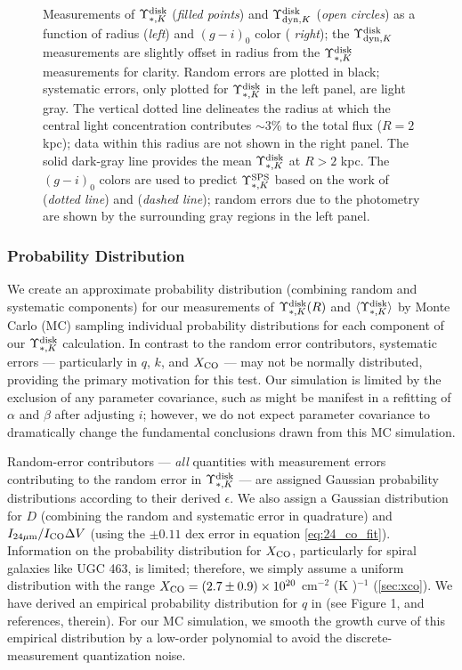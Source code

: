 \documentclass[apj,iop,numberedappendix]{emulateapj}
\begin{document}
\begin{figure}
\caption{
%
Measurements of $\Upsilon_{\ast,K}^{\rm disk}$ ({\it filled points}) and $\Upsilon_{{\rm dyn},K}^{\rm disk}$ ({\it open
circles}) as a function of radius ({\it left}) and $(g-i)_0$ color ({\it
right}); the $\Upsilon_{{\rm dyn},K}^{\rm disk}$ measurements are slightly offset in radius from the
$\Upsilon_{\ast,K}^{\rm disk}$ measurements for clarity.  Random errors are plotted in black;
systematic errors, only plotted for $\Upsilon_{\ast,K}^{\rm disk}$ in the left panel, are light
gray.  The vertical dotted line delineates the radius at which the central light
concentration contributes $\sim3$\% to the total flux ($R=2$ kpc); data within
this radius are not shown in the right panel.  The solid dark-gray line provides
the mean $\Upsilon_{\ast,K}^{\rm disk}$ at $R>2$ kpc.  The $(g-i)_0$ colors are used to predict
$\Upsilon_{\ast,K}^{\rm SPS}$ based on the work of  ({\it dotted
line}) and  ({\it dashed line}); random errors
due to the photometry are shown by the surrounding gray regions in the left
panel.
%
}
\label{fig:ml}
\end{figure}

\subsubsection{Probability Distribution}
\label{sec:mlsys}

We create an approximate probability distribution (combining random and
systematic components) for our measurements of $\Upsilon_{\ast,K}^{\rm disk}(R)$ and
$\langle \Upsilon_{\ast,K}^{\rm disk} \rangle$ by Monte Carlo (MC) sampling individual probability
distributions for each component of our $\Upsilon_{\ast,K}^{\rm disk}$ calculation.  In contrast
to the random error contributors, systematic errors --- particularly in $q$,
$k$, and $X_{\rm CO}$ --- may not be normally distributed, providing the primary
motivation for this test.  Our simulation is limited by the exclusion of any
parameter covariance, such as might be manifest in a refitting of $\alpha$ and
$\beta$ after adjusting $i$; however, we do not expect parameter covariance to
dramatically change the fundamental conclusions drawn from this MC simulation.

Random-error contributors --- {\it all} quantities with measurement errors
contributing to the random error in $\Upsilon_{\ast,K}^{\rm disk}$ --- are assigned Gaussian
probability distributions according to their derived $\epsilon$.  We also assign
a Gaussian distribution for $D$ (combining the random and systematic error in
quadrature) and $I_{24\mu{\rm m}}/I_{\rm CO}\Delta V$ (using the $\pm0.11$ dex error in equation
\ref{eq:24_co_fit}).  Information on the probability distribution for $X_{\rm CO}$,
particularly for spiral galaxies like UGC 463, is limited; therefore, we simply
assume a uniform distribution with the range $X_{\rm CO} = (2.7 \pm 0.9) \times
10^{20}$ cm$^{-2}$ (K \kms)$^{-1}$ (\sect \ref{sec:xco}).  We have derived an
empirical probability distribution for $q$ in 
(see Figure 1, and references, therein).  For our MC simulation, we smooth the
growth curve of this empirical distribution by a low-order polynomial to avoid
the discrete-measurement quantization noise.
\end{document}
